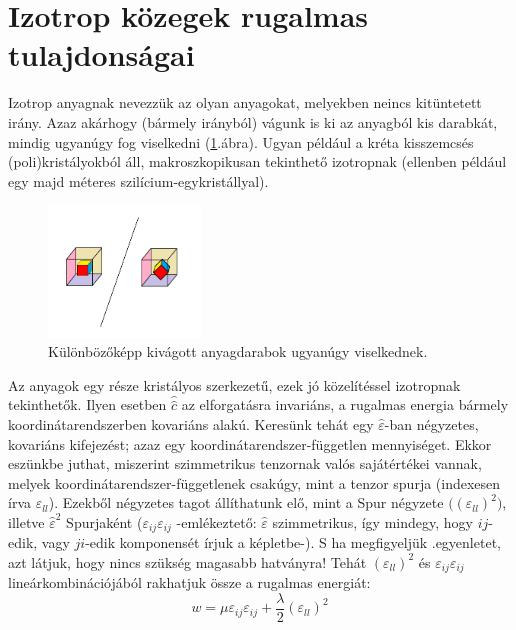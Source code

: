 \documentclass[a4paper, 12pt, titlepage]{article}
\begin{document}
\section*{Izotrop közegek rugalmas tulajdonságai}
Izotrop anyagnak nevezzük az olyan anyagokat, melyekben neincs kitüntetett irány. Azaz akárhogy (bármely irányból) vágunk is ki az anyagból kis darabkát, mindig ugyanúgy fog viselkedni (\ref{fig:izotrop}.\hspace{1mm}ábra). Ugyan például a kréta kisszemcsés (poli)kristályokból áll, makroszkopikusan tekinthető izotropnak (ellenben például egy majd méteres szilícium-egykristállyal).
	\begin{figure}[!h]
	\includegraphics[height=3.5cm]{./izotrop.png} %
	\centering
	\caption{Különbözőképp kivágott anyagdarabok ugyanúgy viselkednek.}
	\label{fig:izotrop}
	\end{figure}
Az anyagok egy része kristályos szerkezetű, ezek jó közelítéssel izotropnak tekinthetők. Ilyen esetben $\hat{\hat{c}}$ az elforgatásra invariáns, a rugalmas energia bármely koordinátarendszerben kovariáns alakú. Keresünk tehát egy $\hat{\varepsilon}$-ban négyzetes, kovariáns kifejezést; azaz egy koordinátarendszer-független mennyiséget. Ekkor eszünkbe juthat, miszerint szimmetrikus tenzornak valós sajátértékei vannak, melyek koordinátarendszer-függetlenek csakúgy, mint a tenzor spurja (indexesen írva $\varepsilon_{ll}$). Ezekből négyzetes tagot állíthatunk elő, mint a Spur négyzete $\Big((\varepsilon_{ll})^{2}\Big)$, illetve $\hat{\varepsilon}^{2}$ Spurjaként ($\varepsilon_{ij}\varepsilon_{ij}$ -emlékeztető: $\hat{\varepsilon}$ szimmetrikus, így mindegy, hogy $ij$-edik, vagy $ji$-edik komponensét írjuk a képletbe-). S ha megfigyeljük .\hspace{1mm}egyenletet, azt látjuk, hogy nincs szükség magasabb hatványra! Tehát $(\varepsilon_{ll})^{2}$ és $\varepsilon_{ij}\varepsilon_{ij}$ lineárkombinációjából rakhatjuk össze a rugalmas energiát:
	\begin{equation}
w=\mu\varepsilon_{ij}\varepsilon_{ij}+\frac{\lambda}{2}(\varepsilon_{ll})^{2} %
	\label{eq:wepsilon}
	\end{equation}
\end{document}

